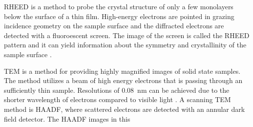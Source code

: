 \gls{RHEED} is a method to probe the crystal structure of only a few monolayers below the surface of a thin film.
High-energy electrons are pointed in grazing incidence geometry on the sample surface and the diffracted electrons are detected with a fluoroescent screen.
The image of the screen is called the RHEED pattern and it can yield information about the symmetry and crystallinity of the sample surface
    \cite{hafez2022}.

\gls{TEM} is a method for providing highly magnified images of solid state samples.
The method utilizes a beam of high energy electrons that is passing through an sufficiently thin sample.
Resolutions of \qty{0.08}{\nm} can be achieved due to the shorter wavelength of electrons compared to visible light
    \cite{schroder2005}.
A scanning \acrshort{TEM} method is \gls{HAADF}, where scattered electrons are detected with an annular dark field detector.
The \acrshort{HAADF} images in this 